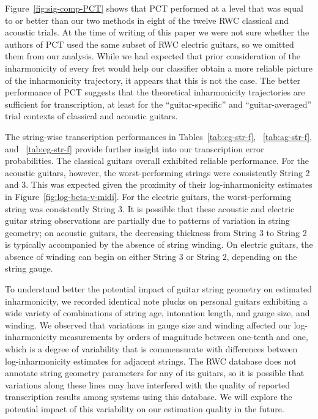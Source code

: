 \documentclass[convention,peer-reviewed]{aesconf}
\begin{document}
Figure~\ref{fig:sig-comp-PCT} shows that PCT performed at a level that was equal to or better than  our two methods in eight of the twelve RWC classical and acoustic trials. At the time of writing of this paper we were not sure whether the authors of PCT used the same subset of RWC electric guitars, so we omitted them from our analysis. While we had expected that prior consideration of the inharmonicity of every fret would help our classifier obtain a more reliable picture of the inharmonicity trajectory, it appears that this is not the case. The better performance of PCT suggests that the theoretical inharmonicity trajectories are sufficient for transcription, at least for the ``guitar-specific'' and ``guitar-averaged'' trial contexts of classical and acoustic guitars. 

The string-wise transcription performances in Tables~\ref{tab:cg-str-f}, ~\ref{tab:ag-str-f}, and ~\ref{tab:eg-str-f} provide further insight into our transcription error probabilities. The classical guitars overall exhibited reliable performance. For the acoustic guitars, however, the worst-performing strings were consistently String 2 and 3. This was expected given the proximity of their log-inharmonicity estimates in Figure~\ref{fig:log-beta-v-midi}. For the electric guitars, the worst-performing string was consistently String 3. It is possible that these acoustic and electric guitar string observations are partially due to patterns of variation in string geometry; on acoustic guitars, the decreasing thickness from String 3 to String 2 is typically accompanied by the absence of string winding. On electric guitars, the absence of winding can begin on either String 3 or String 2, depending on the string gauge.

To understand better the potential impact of guitar string geometry on estimated inharmonicity, we recorded identical note plucks on personal guitars exhibiting a wide variety of combinations of string age, intonation length, and gauge size, and winding.  We observed that variations in gauge size and winding affected our log-inharmonicity measurements by orders of magnitude between one-tenth and one, which is a degree of variability that is commensurate with differences between log-inharmonicity estimates for adjacent strings. The RWC database does not annotate string geometry parameters for any of its guitars, so it is possible that variations along these lines may have interfered with the quality of reported transcription results among systems using this database. We will explore the potential impact of this variability on our estimation quality in the future.
\end{document}
